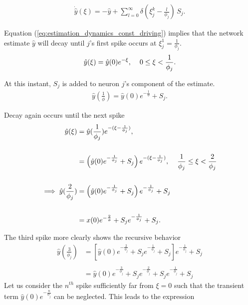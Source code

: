 \begin{align}
\label{eq:estimation_dynamics_const_driving}
\dot{\hat{y}}(\xi) = - \hat{y} + \sum_{l=0}^{\infty} \delta \left(\xi_j^k - \frac{l}{\phi_j}\right) \, S_j .
\end{align}

Equation (\ref{eq:estimation_dynamics_const_driving}) implies that the network estimate $\hat{y}$ will decay until $j$'s first spike  occurs at $\xi_j^1 = \frac{1}{\phi_j}$. 
\begin{align*}
\hat{y}(\xi) = \hat{y}(0) e^{-\xi}, \hspace{4mm} 0 \leq \xi < \frac{1}{\phi_j}.
\end{align*}


 At this instant, $S_j$ is added to neuron $j$'s component of the estimate.
 \begin{align*}
 \hat{y}( \frac{1}{\phi}) =  \hat{y}(0) e^{- \frac{1}{\phi}} + S_j.
 \end{align*}
 
Decay again occurs until the next spike
\begin{align*}
\hat{y}(\xi) &= \hat{y}(\frac{1}{\phi_j}) e^{-(\xi - \frac{1}{\phi_j})}, \\
\\
&= 
\left( \hat{y}(0) e^{- \frac{1}{\phi_j}} + S_j \right)e^{-(\xi - \frac{1}{\phi_j})} , \hspace{4mm} 
\frac{1}{\phi_j} \leq \xi < \frac{2}{\phi_j}\\
\\
\implies
\hat{y}(\frac{2}{\phi_j}) &= \left(\hat{y}(0)e^{- \frac{1}{\phi_j}} + S_j \right) e^{-\frac{1}{\phi_j}} + S_j\\
\\
&= x(0)
e^{-\frac{2}{\phi}} + S_j e^{-\frac{1}{\phi_j}} 
+ S_j.
\end{align*}

The third spike more clearly shows the recursive behavior
\begin{align*}
\hat{y}(\frac{3}{\phi_j}) &= \left[\hat{y}(0)
e^{-\frac{2}{\phi_j}} + S_j e^{-\frac{1}{\phi_j}} 
+ S_j\right] e^{-\frac{1}{\phi_j}} + S_j\\
\\
&= \hat{y}(0) e^{-\frac{3}{\phi_j}} + S_j e^{-\frac{2}{\phi_j}} 
+ S_j e^{-\frac{1}{\phi_j}} + S_j
\end{align*}
Let us consider the $n^{th}$ spike sufficiently far from $\xi=0$ such that the transient term $\hat{y}(0)e^{-\frac{n}{\phi_j}}$ can be neglected. This leads to the expression

